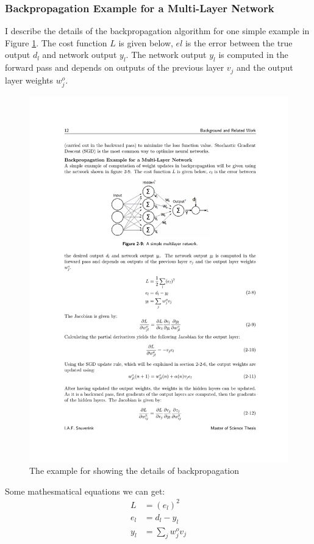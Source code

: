     \subsubsection{Backpropagation Example for a Multi-Layer Network}
    I describe the details of the backpropagation algorithm for one simple example in Figure \ref{bp}. The cost function $L$ is given below, $el$ is the error between the true output $d_l$ and network output $y_l$. The network output $y_l$ is computed in the forward pass and depends on outputs of the previous layer $v_j$ and the output layer weights $w^{o}_j$.
    \begin{figure}[!h]
        \centering
        \includegraphics{Figures/bp.pdf}
        \caption{The example for showing the details of backpropagation}
        \label{bp}
    \end{figure}
    Some mathesmatical equations we can get:
    \begin{equation}
        \begin{aligned}
            L &= (e_l)^2 \\
            e_l &= d_l -y_l \\
            y_l &= \sum_{j}w^{o}_j v_j 
        \end{aligned}
        \label{me}
    \end{equation}

